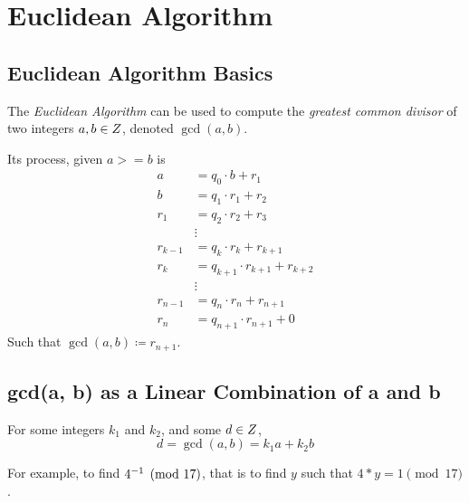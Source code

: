 \chapter{Euclidean Algorithm}

\section{Euclidean Algorithm Basics}

\begin{definition}
    The \textit{Euclidean Algorithm} can be used to compute the \textit{greatest common divisor} of two integers $a, b \in \relax{Z}$, denoted $\gcd(a, b)$.
    
    Its process, given $a >= b$ is
    \begin{align}
        a           &= q_0 \cdot b + r_1 \\
        b           &= q_1 \cdot r_1 + r_2 \\
        r_1         &= q_2 \cdot r_2 + r_3 \\
                    &\vdots \nonumber \\
        r_{k - 1}   &= q_k \cdot r_k + r_{k + 1} \\
        r_k         &= q_{k + 1} \cdot r_{k + 1} + r_{k + 2} \\
                    &\vdots \nonumber \\
        r_{n - 1}   &= q_n \cdot r_n + r_{n + 1} \\
        r_n         &= q_{n + 1} \cdot r_{n + 1} + 0
    \end{align}
    Such that $\gcd(a, b) \coloneqq r_{n + 1}$.
\end{definition}

\section{gcd(a, b) as a Linear Combination of a and b}

\begin{proposition}
    For some integers $k_1$ and $k_2$, and some $d \in \relax{Z}$,
    \begin{equation}
        d = \gcd(a, b) = k_1 a + k_2 b
    \end{equation}
\end{proposition}

\begin{remark}
    For example, to find ${4}^{-1} \pmod{17}$, that is to find $y$ such that $4 \ast y = 1 \pmod{17}$.
\end{remark}